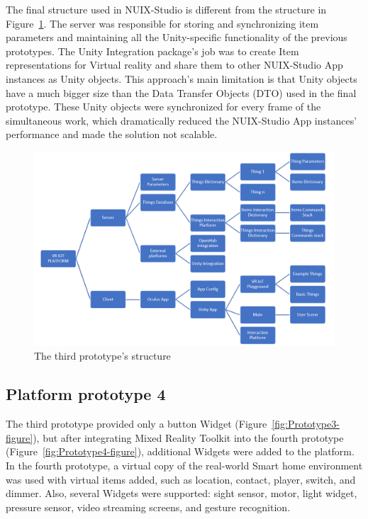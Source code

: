 The final structure used in NUIX-Studio is different from the structure in Figure~\ref{fig:Prototype3Structure-figure}. The server was responsible for storing and synchronizing item parameters and maintaining all the Unity-specific functionality of the previous prototypes. The Unity Integration package's job was to create Item representations for Virtual reality and share them to other NUIX-Studio App instances as Unity objects. This approach's main limitation is that Unity objects have a much bigger size than the Data Transfer Objects (DTO) used in the final prototype. These Unity objects were synchronized for every frame of the simultaneous work, which dramatically reduced the NUIX-Studio App instances' performance and made the solution not scalable.

\begin{figure}
  \centering
  \includegraphics[width=0.9\linewidth]{figures/Prototype3Structure.png}
  \caption{The third prototype's structure}
  \label{fig:Prototype3Structure-figure}
\end{figure}

\subsection{Platform prototype 4}

The third prototype provided only a button Widget (Figure~\ref{fig:Prototype3-figure}), but after integrating Mixed Reality Toolkit into the fourth prototype (Figure~\ref{fig:Prototype4-figure}), additional Widgets were added to the platform. In the fourth prototype, a virtual copy of the real-world Smart home environment was used with virtual items added, such as location, contact, player, switch, and dimmer. Also, several Widgets were supported: sight sensor, motor, light widget, pressure sensor, video streaming screens, and gesture recognition.

